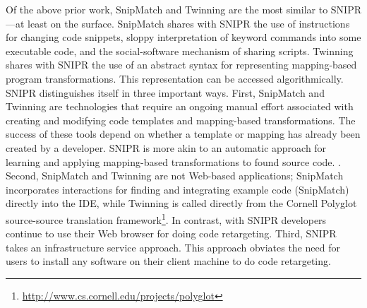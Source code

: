 Of the above prior work, SnipMatch and Twinning are the most similar to \uppercase{SnipR}---at least on the surface. SnipMatch shares with \uppercase{SnipR} the use of instructions for changing code snippets, sloppy interpretation of keyword commands into some executable code, and the social-software mechanism of sharing scripts. Twinning shares with \uppercase{SnipR} the use of an abstract syntax for representing mapping-based program transformations. This representation can be accessed algorithmically. \uppercase{SnipR} distinguishes itself in three important ways. First, SnipMatch and Twinning are technologies that require an ongoing manual effort associated with creating and modifying code templates and mapping-based transformations. The success of these tools depend on whether a template or mapping has already been created by a developer. \uppercase{SnipR} is more akin to an automatic approach for learning and applying mapping-based transformations to found source code. . Second, SnipMatch and Twinning are not Web-based applications; SnipMatch incorporates interactions for finding and integrating example code (SnipMatch) directly into the IDE, while Twinning is called directly from the Cornell Polyglot source-source translation framework\footnote{\url{http://www.cs.cornell.edu/projects/polyglot}}. In contrast, with \uppercase{SnipR} developers continue to use their Web browser for doing code retargeting. Third, \uppercase{SnipR} takes an infrastructure service approach. This approach obviates the need for users to install any software on their client machine to do code retargeting.     





